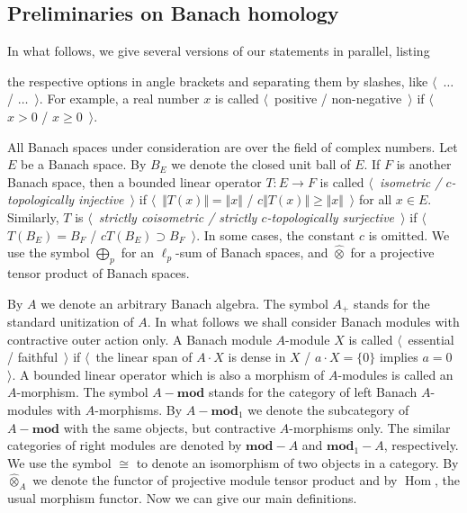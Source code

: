\documentclass{article}
\theoremstyle{plain}
\theoremstyle{definition}
\newcommand{\projtens}{\mathbin{\widehat{\otimes}}}
\newcommand{\isom}{\mathop{\mathbin{\cong}}}
\begin{document}
\begin{fulltext}

\section{Preliminaries on Banach
    homology}\label{SectionPreliminariesOnBanachHomology} 

In what follows, we give several versions of our statements in parallel, listing

the respective options in angle brackets and separating them by slashes, like
$\langle$~$\ldots$ / $\ldots$~$\rangle$. For example, a real number $x$ is
called $\langle$~positive / non-negative~$\rangle$ if $\langle$~$x>0$ / $x\geq
0$~$\rangle$.

All Banach spaces under consideration are over the field of complex numbers. Let
$E$ be a Banach space. By $B_E$ we denote the closed unit ball of $E$. If $F$ is
another Banach space, then a bounded linear operator $T:E\to F$ is called
\emph{$\langle$~isometric / $c$-topologically injective~$\rangle$} if
$\langle$~$\Vert T(x)\Vert=\Vert x\Vert$ / $c\Vert T(x)\Vert\geq\Vert
x\Vert$~$\rangle$ for all $x\in E$. Similarly, $T$ is \emph{$\langle$~strictly
coisometric / strictly $c$-topologically surjective~$\rangle$} if
$\langle$~$T(B_E)=B_F$ / $c T(B_E)\supset B_F$~$\rangle$. In some cases, the
constant $c$ is omitted. We use the symbol $\bigoplus_p$ for an $\ell_p$-sum of
Banach spaces, and $\projtens$ for a projective tensor product of Banach spaces.


By $A$ we denote an arbitrary Banach algebra. The symbol $A_+$ stands for the
standard unitization of $A$. In what follows we shall consider Banach modules
with contractive outer action only. A Banach module $A$-module $X$ is called
$\langle$~essential / faithful~$\rangle$ if $\langle$~the linear span of $A\cdot
X$ is dense in $X$ / $a\cdot X=\{0\}$ implies $a=0$~$\rangle$. A bounded linear
operator which is also a morphism of $A$-modules is called an $A$-morphism. The
symbol $A-\mathbf{mod}$ stands for the category of left Banach $A$-modules with
$A$-morphisms. By $A-\mathbf{mod}_1$ we denote the subcategory of
$A-\mathbf{mod}$ with the same objects, but contractive $A$-morphisms only. The
similar categories of right modules are denoted by $\mathbf{mod}-A$ and
$\mathbf{mod}_1-A$, respectively. We use the symbol $\isom$ to denote an
isomorphism of two objects in a category. By $\projtens_A$ we denote the functor
of projective module tensor product and by $\operatorname{Hom}$, the usual
morphism functor. Now we can give our main definitions.


\end{fulltext}
\end{document}
